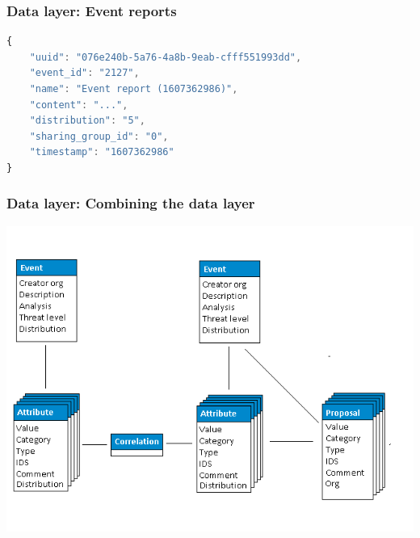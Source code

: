 \begin{frame}[fragile]
    \frametitle{Data layer: Event reports}
    \begin{lstlisting}[language=javascript,firstnumber=1]
{
    "uuid": "076e240b-5a76-4a8b-9eab-cfff551993dd",
    "event_id": "2127",
    "name": "Event report (1607362986)",
    "content": "...",
    "distribution": "5",
    "sharing_group_id": "0",
    "timestamp": "1607362986"
}
\end{lstlisting}
\end{frame}

\begin{frame}
    \frametitle{Data layer: Combining the data layer}
    \begin{center}
        \includegraphics[width=0.90\linewidth]{screenshots/datamodel4.png}
    \end{center}
\end{frame}

